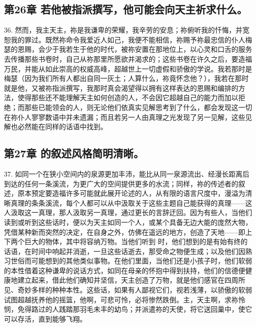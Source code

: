 
\subsection{第26章 若他被指派撰写，他可能会向天主祈求什么。}

36. 然而，我主天主，祢是我谦卑的荣耀，我辛劳的安息；祢俯听我的忏悔，并宽恕我的罪过。既然祢命令我爱近人如己，我便不能相信，祢赐予祢最忠信的仆人梅瑟的恩赐，会少于我若生于他的时代，被祢安置在那地位上，以心灵和口舌的服务去传播那些书卷时，自己从祢那里所愿欲并渴求的；这些书卷在许久之后，要造福万民，并能从如此崇高的权威高峰，超越世上一切虚假和骄傲的学说。我若那时是梅瑟（因为我们所有人都出自同一灰土；人算什么，祢竟怀念他？），我若在那时就是他，又被祢指派撰写，我那时真会渴望得以拥有这样表达的恩赐和编排的方法，使得那些还不能理解天主如何创造的人，不会因它超越自己的能力而加以拒绝；而那些已能领会的人，则无论他们依真实见解思考到了什么，都会发现这一切在祢仆人寥寥数语中并未遗漏；而且若另一人由真理之光发现了另一见解，这些见解也必然能在同样的话语中找到。\par


\subsection{第27章 的叙述风格简明清晰。}

37. 如同一个在狭小空间内的泉源更加丰沛，能比从同一泉源流出、经漫长距离后到达的任何一条溪流，为更广大的空间提供更多的水流；同样，祢的传述者的叙述，原本预定要造福许多可能就此展开论述的人，从有限的语言尺度中，漫溢为清晰真理的条条溪流，每个人都可以从中汲取关于这些主题自己能获得的真理——这人汲取这一真理，那人汲取另一真理，通过更长的言辞迂回。因为有些人，当他们读到或听到这些话时，便以为天主如同一个人，或某个具备无边大能的庞然大物，凭借某种新而突然的决定，在自身之外，仿佛在遥远的地方，创造了天地——即上下两个巨大的物体，其中将容纳万物。当他们听到  时，他们想到的是有始有终的话语，在时间中响起并消逝，一旦这些话逝去，那受命之物便生成；以及他们因熟习世俗而可能想到的其他类似事物。在他们里面，当他们还是小孩子时，他们软弱的本性借着这种谦卑的说话方式，如同在母亲的怀抱中得到扶持，他们的信德便健康地建立起来，借此他们确知并坚信，天主创造了万物，就是他们感官在四周所见、奇妙多样的种种本性。这些话，如果有人鄙视它们，视若浅薄，以骄傲的软弱试图超越抚养他的摇篮，他啊，可悲可怜，必将惨然跌倒。主，天主啊，求祢怜悯，免得路过的人践踏那羽毛未丰的幼鸟；并派遣祢的天使，将它送回巢中，使它可以存活，直到能够飞翔。\par

